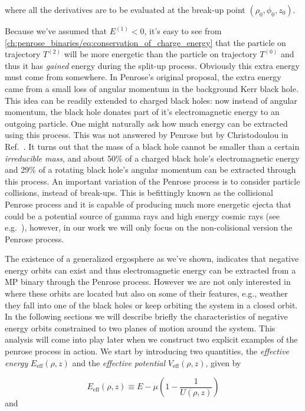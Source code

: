 where all the derivatives are to be evaluated at the break-up point $(\rho_0,\phi_0,z_0)$.

Because we've assumed that $E^{(1)} < 0$, it's easy to see from \eqref{ch:penrose_binaries/eq:conservation_of_charge_energy} that the particle on trajectory $T^{(2)}$ will be more energetic than the particle on trajectory $T^{(0)}$ and thus it has \emph{gained} energy during the split-up process. Obviously this extra energy must come from somewhere. In Penrose's original proposal, the extra energy came from a small loss of angular momentum in the background Kerr black hole. This idea can be readily extended to charged black holes: now instead of angular momentum, the black hole donates part of it's electromagnetic energy to an outgoing particle. One might naturally ask how much energy can be extracted using this process. This was not answered by Penrose but by Christodoulou in Ref.~\cite{CHRISTODOULOU1970}. It turns out that the mass of a black hole cannot be smaller than a certain \emph{irreducible mass}, and about 50\% of a charged black hole's electromagnetic energy and 29\% of a rotating black hole's angular momentum can be extracted through this process. An important variation of the Penrose process is to consider particle collisions, instead of break-ups. This is befittingly known as the collisional Penrose process and it is capable of producing much more energetic ejecta that could be a potential source of gamma rays and high energy cosmic rays (see e.g.~\cite{PhysRevLett.114.251103}), however, in our work we will only focus on the non-colisional version the Penrose process.

The existence of a generalized ergosphere as we've shown, indicates that negative energy orbits can exist and thus electromagnetic energy can be extracted from a MP binary through the Penrose process. However we are not only interested in where these orbits are located but also on some of their features, e.g., weather they fall into one of the black holes or keep orbiting the system in a closed orbit. In the following sections we will describe briefly the characteristics of negative energy orbits constrained to two planes of motion around the system. This analysis will come into play later when we construct two explicit examples of the penrose process in action. We start by introducing two quantities, the \emph{effective energy} $E_{\text{eff}}(\rho,z)$ and the \emph{effective potential} $V_{\text{eff}}(\rho,z)$, given by

\begin{equation}
    E_{\text{eff}}(\rho,z) \equiv E - \mu\left(1 - \frac{1}{U(\rho,z)}\right)
    \label{ch:penrose_binaries/eq:effective_energy_definition}
\end{equation}
%
and

